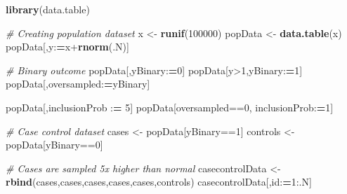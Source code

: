 \documentclass[]{book}
\newenvironment{Shaded}{\begin{snugshade}}{\end{snugshade}}
\newcommand{\KeywordTok}[1]{\textcolor[rgb]{0.13,0.29,0.53}{\textbf{{#1}}}}
\newcommand{\DecValTok}[1]{\textcolor[rgb]{0.00,0.00,0.81}{{#1}}}
\newcommand{\StringTok}[1]{\textcolor[rgb]{0.31,0.60,0.02}{{#1}}}
\newcommand{\CommentTok}[1]{\textcolor[rgb]{0.56,0.35,0.01}{\textit{{#1}}}}
\newcommand{\ErrorTok}[1]{\textcolor[rgb]{0.64,0.00,0.00}{\textbf{{#1}}}}
\newcommand{\NormalTok}[1]{{#1}}
\theoremstyle{definition}
\theoremstyle{definition}
\theoremstyle{remark}
\begin{document}
\begin{Shaded}
\begin{Highlighting}[]
\KeywordTok{library}\NormalTok{(data.table)}

\CommentTok{# Creating population dataset}
\NormalTok{x <-}\StringTok{ }\KeywordTok{runif}\NormalTok{(}\DecValTok{100000}\NormalTok{)}
\NormalTok{popData <-}\StringTok{ }\KeywordTok{data.table}\NormalTok{(x)}
\NormalTok{popData[,y:}\ErrorTok{=}\NormalTok{x+}\KeywordTok{rnorm}\NormalTok{(.N)]}

\CommentTok{# Binary outcome}
\NormalTok{popData[,yBinary:}\ErrorTok{=}\DecValTok{0}\NormalTok{]}
\NormalTok{popData[y>}\DecValTok{1}\NormalTok{,yBinary:}\ErrorTok{=}\DecValTok{1}\NormalTok{]}
\NormalTok{popData[,oversampled:}\ErrorTok{=}\NormalTok{yBinary]}

\NormalTok{popData[,inclusionProb :}\ErrorTok{=}\StringTok{ }\DecValTok{5}\NormalTok{]}
\NormalTok{popData[oversampled==}\DecValTok{0}\NormalTok{, inclusionProb:}\ErrorTok{=}\DecValTok{1}\NormalTok{]}

\CommentTok{# Case control dataset}
\NormalTok{cases <-}\StringTok{ }\NormalTok{popData[yBinary==}\DecValTok{1}\NormalTok{]}
\NormalTok{controls <-}\StringTok{ }\NormalTok{popData[yBinary==}\DecValTok{0}\NormalTok{]}

\CommentTok{# Cases are sampled 5x higher than normal}
\NormalTok{casecontrolData <-}\StringTok{ }\KeywordTok{rbind}\NormalTok{(cases,cases,cases,cases,cases,controls)}
\NormalTok{casecontrolData[,id:}\ErrorTok{=}\DecValTok{1}\NormalTok{:.N]}
\end{Highlighting}
\end{Shaded}
\end{document}
